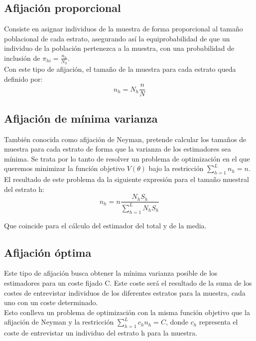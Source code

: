 \subsection{Afijación proporcional} \label{sect:4.1.2}
Consiste en asignar individuos de la muestra de forma proporcional al tamaño poblacional de cada estrato, asegurando así la equiprobabilidad de que un individuo de la población pertenezca a la muestra, con una probabilidad de inclusión de $\pi_{hi} = \frac{n_h}{N_h}$. \\

Con este tipo de afijación, el tamaño de la muestra para cada estrato queda definido por:
\begin{equation}
    n_h = N_h\frac{n}{N}
\end{equation}


\subsection{Afijación de mínima varianza} \label{sect:4.1.3}
También conocida como afijación de Neyman, pretende calcular los tamaños de muestra para cada estrato de forma que la varianza de los estimadores sea mínima. Se trata por lo tanto de resolver un problema de optimización en el que queremos minimizar la función objetivo $V(\theta)$ bajo la restricción $\sum\limits_{h=1}^L n_h = n$.\\

El resultado de este problema da la siguiente expresión para el tamaño muestral del estrato h:
\begin{equation}
    n_h = n\frac{N_hS_h}{\sum\limits_{h=1}^LN_hS_h}
\end{equation}

Que coincide para el cálculo del estimador del total y de la media.

\subsection{Afijación óptima} \label{sect:4.1.4}
Este tipo de afijación busca obtener la mínima varianza posible de los estimadores para un coste  fijado C. Este coste será el resultado de la suma de los costes de entrevistar individuos de los diferentes estratos para la muestra, cada uno con un coste determinado. \\

Esto conlleva un problema de optimización con la misma función objetivo que la afijación de Neyman y la restricción $\sum\limits_{h=1}^L c_hn_h = C$, donde $c_h$ representa el coste de entrevistar un individuo del estrato h para la muestra.

